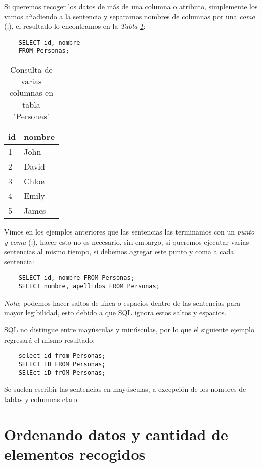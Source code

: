 Si queremos recoger los datos de más de una columna o atributo, simplemente los vamos añadiendo a la sentencia y separamos nombres de columnas por una \textit{coma} (,), el resultado lo encontramos en la \textit{Tabla \ref{tab: 3}}:
\begin{lstlisting}
    SELECT id, nombre
    FROM Personas;
\end{lstlisting}
\begin{table}[H]
    \centering
    \caption{Consulta de varias columnas en tabla "Personas"}
    \label{tab: 3}
    \begin{tabular}{|l|l|}
        \hline
        \textbf{id} & \textbf{nombre} \\
        \hline
        1 & John \\
        \hline
        2 & David \\
        \hline
        3 & Chloe \\
        \hline
        4 & Emily \\
        \hline
        5 & James \\
        \hline
    \end{tabular}
\end{table}

Vimos en los ejemplos anteriores que las sentencias las terminamos con un \textit{punto y coma} (;), hacer esto no es necesario, sin embargo, si queremos ejecutar varias sentencias al mismo tiempo, si debemos agregar este punto y coma a cada sentencia:
\begin{lstlisting}
    SELECT id, nombre FROM Personas;
    SELECT nombre, apellidos FROM Personas;
\end{lstlisting}

\textit{Nota}: podemos hacer saltos de línea o espacios dentro de las sentencias para mayor legibilidad, esto debido a que SQL ignora estos saltos y espacios.

SQL no distingue entre mayúsculas y minúsculas, por lo que el siguiente ejemplo regresará el mismo resultado:
\begin{lstlisting}
    select id from Personas;
    SELECT ID FROM Personas;
    SElEct iD frOM Personas;
\end{lstlisting}

Se suelen escribir las sentencias en mayúsculas, a excepción de los nombres de tablas y columnas claro.



\section{Ordenando datos y cantidad de elementos recogidos}


